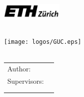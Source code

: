 \begin{titlepage}
  \begin{minipage}[c]{0.5\textwidth}
  	\begin{flushleft}
  		\includegraphics[width=30mm]{logos/eth.eps}\\
  		{\scriptsize\getFacultyOne{}} \\
  		{\scriptsize\getUniversityOne{}}
  	\end{flushleft}
  \end{minipage}%
  \begin{minipage}[c]{0.5\textwidth}
  	\begin{flushright}
	  	\texttt{[image: logos/GUC.eps]}\\
	  	{\scriptsize\getFacultyTwo{}} \\
	  	{\scriptsize\getUniversityTwo{}}
  	\end{flushright}
  \end{minipage}
  
  
  \centering

  \vspace{20mm}
  {\Large \getDoctype{}}

  \vspace{15mm}
  {\huge\bfseries \getTitle{}}

  \vspace{10mm}
  {\bfseries \getSubmissionDate{}}

  \vspace{70mm}
  \begin{tabular}{l l}
    Author:          & \getAuthor{} \\
    Supervisors:      & \getSupervisorOne{} \\ & \getSupervisorTwo{} \\ & \getSupervisorThree{} \\
  \end{tabular}
\end{titlepage}
